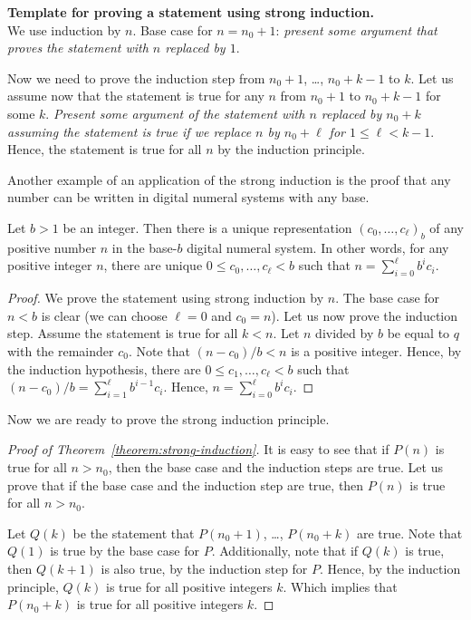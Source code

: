 \begin{template}
  \textbf{Template for proving a statement using strong induction.} \\

  We use induction by $n$. Base case for $n = n_0 + 1$: \emph{present some
  argument that proves the statement with $n$ replaced by $1$}. 

  Now we need to prove the induction step from $n_0 + 1$, \dots, $n_0 + k - 1$
  to $k$. Let us assume now that the statement is true for any $n$ from $n_0 +
  1$ to $n_0 + k - 1$ for some $k$. \emph{Present some argument of the statement
  with $n$ replaced by $n_0 + k$ assuming the statement is true if we replace
  $n$ by $n_0 + \ell$ for $1 \le \ell < k - 1$}. Hence,
  the statement is true for all $n$ by the induction principle.
\end{template}



Another example of an application of the strong induction is the proof that
any number can be written in digital numeral systems with any base.
\begin{theorem}
  Let $b > 1$ be an integer. Then there is a unique representation 
  $(c_0, \dots, c_\ell)_b$ of any positive number $n$ in the base-$b$ digital
  numeral system. 
  In other words, for any positive integer $n$, there are unique 
  $0 \le c_0, \dots, c_\ell < b$ such that $n = \sum_{i = 0}^\ell b^i c_i$.
\end{theorem}
\begin{proof}
  We prove the statement using strong induction by $n$. The base case for
  $n < b$ is clear (we can choose $\ell = 0$ and $c_0 = n$).
  Let us now prove the induction step. Assume the statement is true for all
  $k < n$. Let $n$ divided by $b$ be equal to $q$ with the remainder $c_0$.
  Note that $(n - c_0) / b < n$ is a positive integer. Hence,
  by the induction hypothesis, there are
  $0 \le c_1, \dots, c_\ell < b$
  such that $(n - c_0) / b = \sum_{i = 1}^\ell b^{i - 1} c_i$. Hence,
  $n = \sum_{i = 0}^\ell b^i c_i$.
\end{proof}

Now we are ready to prove the strong induction principle.
\begin{proof}[Proof of Theorem~\ref{theorem:strong-induction}]
  It is easy to see that if $P(n)$ is true for all $n > n_0$, then the base
  case and the induction steps are true. Let us prove that if the base case and
  the induction step are true, then $P(n)$ is true for all $n > n_0$.

  Let $Q(k)$ be the statement that $P(n_0 + 1)$, \dots, $P(n_0 + k)$ are true.
  Note that $Q(1)$ is true by the base case for $P$. Additionally, note that if
  $Q(k)$ is true, then $Q(k + 1)$ is also true, by the induction step for $P$.
  Hence, by the induction principle, $Q(k)$ is true for all positive integers
  $k$. Which implies that $P(n_0 + k)$ is true for all positive integers $k$.
\end{proof}


